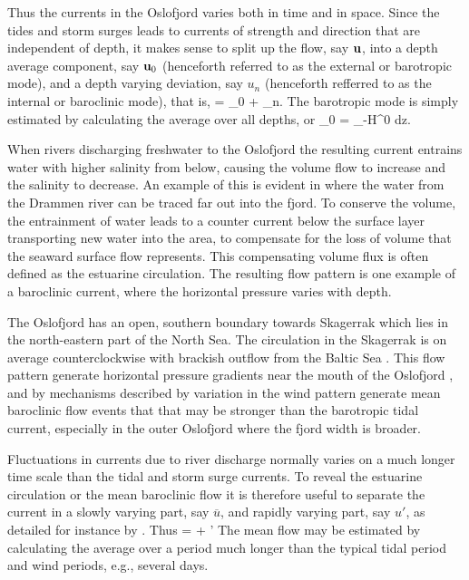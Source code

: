 Thus the currents in the Oslofjord varies both in time and in space. Since the tides and storm surges leads to currents of strength and direction that are independent of depth, it makes sense to split up the flow, say $\mathbf{u}$, into a depth average component, say $\mathbf{u}_0$ (henceforth referred to as the external or barotropic mode), and a depth varying deviation, say $u_n$ (henceforth refferred to as the internal or baroclinic mode), that is,
\be
	\label{eq:ubar_un}
		\bu = \bu_0 + \bu_n.
\ee
The barotropic mode is simply estimated by calculating the average over all depths, or 
\be
	\label{eq:ubar}
		\bu_0 =  \int_{-H}^{0} \bu dz. 
\ee

When rivers discharging freshwater to the Oslofjord the resulting current entrains water with higher salinity from below, causing the volume flow to increase and the salinity to decrease. An example of this is evident in \cite[][Figure 20]{roed:etal:2016} where the water from the Drammen river can be traced far out into the fjord. To conserve the volume, the entrainment of water leads to a counter current below the surface layer transporting new water into the area, to compensate for the loss of volume that the seaward surface flow represents. This compensating volume flux is often defined as the estuarine circulation. The resulting flow pattern is one example of a baroclinic current, where the horizontal pressure varies with depth. 

The Oslofjord has an open, southern boundary towards Skagerrak which lies in the north-eastern part of the North Sea. The circulation in the Skagerrak is on average counterclockwise with brackish outflow from the Baltic Sea \cite[]{rodhe96,svendsen96,albre:roed:2010}. This flow pattern generate horizontal pressure gradients near the mouth of the Oslofjord \cite[]{baals90}, and by mechanisms described by \cite{klinck81} variation in the wind pattern generate mean baroclinic flow events that that may be stronger than the barotropic tidal current, especially in the outer Oslofjord where the fjord width is broader.

Fluctuations in currents due to river discharge normally varies on a much longer time scale than the tidal and storm surge currents. To reveal the estuarine circulation or the mean baroclinic flow it is therefore useful to separate the current in a slowly varying part, say $\overline{u}$, and rapidly varying part, say $u'$, as detailed for instance by \cite{roed:fossu:2004}. Thus
\be
	\label{eq:utime}
		\bu = \overline{\bu} + \bu'
\ee
The mean flow may be estimated by calculating the average over a period much longer than the typical tidal period and wind periods, e.g., several days.

